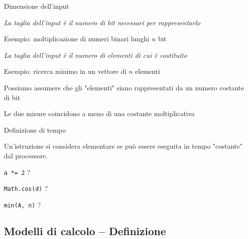 \begin{frame}[shrink=5]{Dimensione dell'input}

\begin{myboxtitle}
\BI
\item \emph{La taglia dell'input è il numero di bit necessari per rappresentarlo}
\item Esempio: moltiplicazione di numeri binari lunghi $n$ bit
\EI
\end{myboxtitle}

\begin{myboxtitle}
\BI
\item \emph{La taglia dell'input è il numero di elementi di cui è costituito}
\item Esempio: ricerca minimo in un vettore di $n$ elementi
\EI
\end{myboxtitle}

\begin{myboxtitle}
\BI
\item Possiamo assumere che gli "elementi" siano rappresentati da un numero costante di bit
\item Le due misure coincidono a meno di una costante moltiplicativa
\EI
\end{myboxtitle}

\end{frame}

\begin{frame}{Definizione di tempo}

\begin{myboxtitle}
Un'istruzione si considera elementare se può essere eseguita in tempo "costante"
dal processore.
\end{myboxtitle}

\begin{myboxtitle}
\BI
\item \texttt{a *= 2} ?
\item \texttt{Math.cos(d)} ?
\item \texttt{min(A, n)} ?
\EI
\end{myboxtitle}


\end{frame}

\subsection{Modelli di calcolo -- Definizione}

